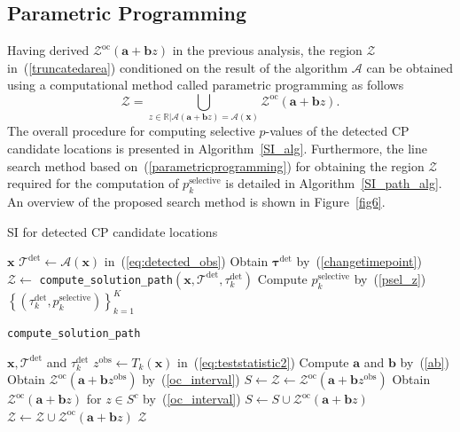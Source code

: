 \subsection{Parametric Programming}
\label{subsec:parametricprogramming}
Having derived $\mathcal{Z}^{\text{oc}} (\bm{a} + \bm{b}z)$ in the previous analysis, 
the region $\mathcal{Z}$ in~(\ref{truncatedarea}) conditioned on the result of the algorithm $\mathcal{A}$ can be obtained using 
a computational method called parametric programming as follows
\begin{equation}
  \mathcal{Z} = \bigcup_{z \in \mathbb{R} |  \mathcal{A}( \bm{a} + \bm{b} z) = \mathcal{A}(\bm{x})} \mathcal{Z}^{\text{oc}} (\bm{a} + \bm{b}z). \label{parametricprogramming}
\end{equation}
The overall procedure for computing selective $p$-values of the detected CP candidate locations is presented in Algorithm~\ref{SI_alg}.
Furthermore, the line search method based on~(\ref{parametricprogramming}) for obtaining the region $\mathcal{Z}$ required for the computation of $p_k^{\text{selective}}$ is detailed in Algorithm~\ref{SI_path_alg}. 
An overview of the proposed search method is shown in Figure~\ref{fig6}. 

\begin{algorithm}[t] 
  \caption{SI for detected CP candidate locations}
  \label{SI_alg}
  \begin{algorithmic}[1]
    \REQUIRE $\bm{x}$
    \STATE $\bm{\mathcal{T}}^{\text{det}} \leftarrow \mathcal{A}(\bm{x})$ in~(\ref{eq:detected_obs})
    \STATE Obtain $\bm{\tau}^{\text{det}}$ by~(\ref{changetimepoint}) 
      \STATE $\mathcal{Z} \leftarrow$ \texttt{compute\_solution\_path}$\left(\bm{x}, \bm{\mathcal{T}}^{\text{det}}, \tau_k^{\text{det}}\right)$ 
      \STATE Compute $p_k^{\text{selective}}$ by~(\ref{psel_z}) 
    \ENDFOR
    \ENSURE $\left\{\left(\tau_k^{\text{det}}, p_k^{\text{selective}}\right)\right\}_{k=1}^{K}$
  \end{algorithmic}
\end{algorithm}

\begin{algorithm}[t] 
  \caption{\texttt{compute\_solution\_path}}
  \label{SI_path_alg}
  \begin{algorithmic}[1]
    \REQUIRE $\bm{x}, \bm{\mathcal{T}}^{\text{det}}$ and $\tau_k^{\text{det}}$
    \STATE $z^{\text{obs}} \leftarrow T_k(\bm{x})$ in~(\ref{eq:teststatistic2})
    \STATE Compute $\bm{a}$ and $\bm{b}$ by~(\ref{ab})
    \STATE Obtain $\mathcal{Z}^{\text{oc}}(\bm{a}+\bm{b}z^{\text{obs}})$ by~(\ref{oc_interval})
    \STATE $S \leftarrow \mathcal{Z} \leftarrow \mathcal{Z}^{\text{oc}}(\bm{a}+\bm{b}z^{\text{obs}})$
      \STATE Obtain $\mathcal{Z}^{\text{oc}}(\bm{a}+\bm{b}z)$ for $z \in S^c$ by~(\ref{oc_interval})
      \STATE $S \leftarrow S \cup \mathcal{Z}^{\text{oc}}(\bm{a}+\bm{b}z)$
        \STATE $\mathcal{Z} \leftarrow \mathcal{Z} \cup \mathcal{Z}^{\text{oc}}(\bm{a}+\bm{b}z)$
      \ENDIF 
    \ENDWHILE
    \ENSURE $\mathcal{Z}$
  \end{algorithmic}
\end{algorithm}

